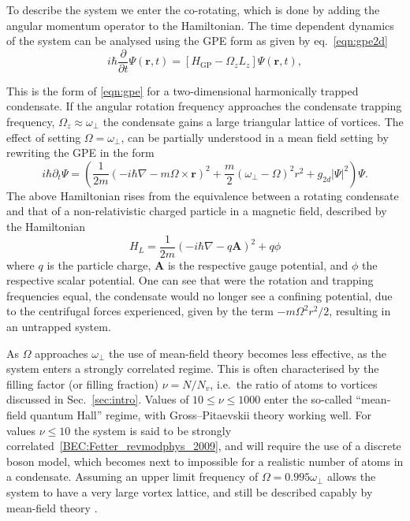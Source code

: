 To describe the system we enter the co-rotating, which is done by adding the angular momentum operator to the Hamiltonian. The time dependent dynamics of the system can be analysed using the GPE form as given by eq.~\ref{eqn:gpe2d}
\begin{equation}\label{eqn:gpe2d}
	i\hbar\frac{\partial}{\partial t}\Psi(\mathbf{r},t) = \left[ H_{\text{GP}}  -  \Omega_z L_z \right] \Psi(\mathbf{r},t),
\end{equation}

This is the form of \ref{eqn:gpe} for a two-dimensional harmonically trapped condensate. If the angular rotation frequency approaches the condensate trapping frequency, $\Omega_z \approx \omega_\perp$ the condensate gains a large triangular lattice of vortices.  The effect of setting $\Omega=\omega_\perp$, can be partially understood in a mean field setting by rewriting the GPE in the form
\begin{equation}
    i\hbar\partial_t \Psi =
    \left(\frac{1}{2m}(-i\hbar\nabla - m\Omega\times\mathbf{r})^2 + \frac{m}{2}(\omega_\perp - \Omega)^2{r}^2 + g_{2d}|\Psi|^2 \right)\Psi.
\end{equation}
The above Hamiltonian rises from the equivalence between a rotating condensate and that of a non-relativistic charged particle in a magnetic field, described by the Hamiltonian
\begin{equation}
     H_L = \frac{1}{2m}\left(-i\hbar \nabla  - q\mathbf{A}\right)^2 + q\phi
\end{equation}
where $q$ is the particle charge, $\mathbf{A}$ is the respective gauge potential, and $\phi$ the respective scalar potential. One can see that were the rotation and trapping frequencies equal, the condensate would no longer see a confining potential, due to the centrifugal forces experienced, given by the term $-m\Omega^2r^2/2$, resulting in an untrapped system.

As $\Omega$ approaches $\omega_\perp$ the use of mean-field theory becomes less effective, as the system enters a strongly correlated regime. This is often
characterised by the filling factor (or filling fraction) $\nu=N/N_v$, i.e.~the ratio of atoms to vortices discussed in Sec.~\ref{sec:intro}. Values of $10 \leq \nu \leq 1000$ enter the so-called ``mean-field quantum Hall'' regime, with Gross--Pitaevskii theory working well. For values $\nu \leq 10$ the system is said to be strongly correlated~\ref{BEC:Fetter_revmodphys_2009}, and will require the use of a discrete boson model, which becomes next to impossible for a realistic number of atoms in a condensate. Assuming an upper limit frequency of $\Omega = 0.995\omega_\perp$ allows the system to have a very large vortex lattice, and still be described capably by mean-field theory \cite{Vtx:Fetter_rmp_2009}.

